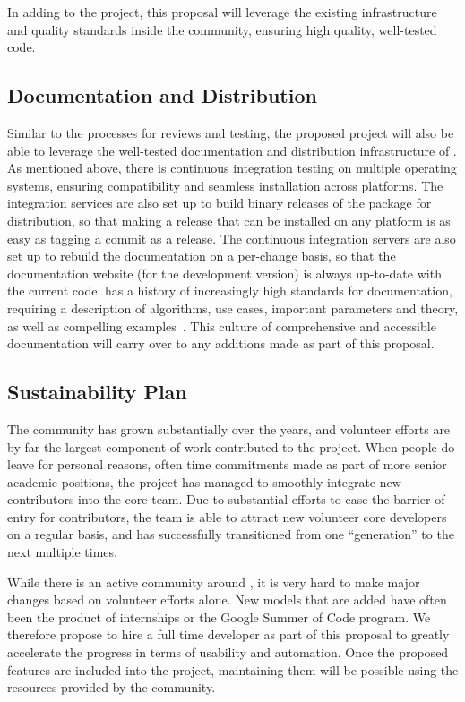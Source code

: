 In adding to the \sklearn{} project, this proposal will leverage the existing infrastructure
and quality standards inside the \sklearn{} community, ensuring high quality, well-tested code.

\subsection{Documentation and Distribution}
Similar to the processes for reviews and testing, the proposed project will
also be able to leverage the well-tested documentation and distribution
infrastructure of \sklearn{}.
As mentioned above, there is continuous integration testing on multiple operating systems,
ensuring compatibility and seamless installation across platforms.
The integration services are also set up to build binary releases of the \sklearn{} package
for distribution, so that making a release that can be installed on any platform is as
easy as tagging a commit as a release.
The continuous integration servers are also set up to rebuild the documentation on a per-change
basis, so that the documentation website (for the development version) is always up-to-date
with the current code.
\sklearn{} has a history of increasingly high standards for documentation,
requiring a description of algorithms, use cases, important parameters and theory,
as well as compelling examples~\autocite{lovesklearn, benlorica}. This culture of comprehensive and accessible documentation
will carry over to any additions made as part of this proposal.

\subsection{Sustainability Plan}
The \sklearn{} community has grown substantially over the years, and volunteer efforts
are by far the largest component of work contributed to the project.
When people do leave for personal reasons, often time commitments made as part
of more senior academic positions, the project has managed to smoothly integrate new
contributors into the core team. Due to substantial efforts to ease the barrier
of entry for contributors, the \sklearn{} team is able to attract new volunteer
core developers on a regular basis, and has successfully transitioned from one
``generation'' to the next multiple times. 

While there is an active community around \sklearn{}, it is very hard to make
major changes based on volunteer efforts alone. New models that are added have
often been the product of internships or the Google Summer of Code program.  We
therefore propose to hire a full time developer as part of this proposal to
greatly accelerate the progress in terms of usability and automation. Once
the proposed features are included into the project, maintaining them will be
possible using the resources provided by the community. 

